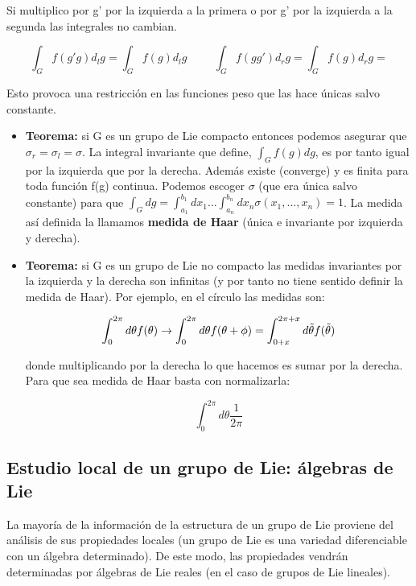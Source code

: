 \documentclass{article}
\begin{document}
Si multiplico por g' por la izquierda a la primera o por g' por la izquierda a la segunda las integrales no cambian.

$$\int _G f(g'g)d_lg=\int _G f(g)d_lg \hspace{1cm} \int _G f(gg')d_rg=\int _G f(g)d_rg=$$

Esto provoca una restricción en las funciones peso que las hace únicas salvo constante.

\bigskip
\begin{itemize}
\item      \textbf{Teorema:} si G es un grupo de Lie compacto entonces podemos asegurar que $\sigma _r=\sigma_l=\sigma$. La integral invariante que define, $\int _G f(g)d g$, es por tanto igual por la izquierda que por la derecha. Además existe (converge) y es finita para toda función f(g) continua. Podemos escoger $\sigma$ (que era única salvo constante) para que $\int _G dg=\int ^{b_1}_{a_1} dx_1...\int ^{b_n}_{a_n} dx_n \sigma (x_1,...,x_n)=1$. La medida así definida la llamamos \textbf{medida de Haar} (única e invariante por izquierda y derecha).

\item \textbf{Teorema:} si G es un grupo de Lie no compacto las medidas invariantes por la izquierda y la derecha son infinitas (y por tanto no tiene sentido definir la medida de Haar). Por ejemplo, en el círculo las medidas son:

$$\int ^{2\pi}_0 d\theta f(\theta) \to \int ^{2\pi}_0 d\theta f(\theta +\phi)= \int ^{2\pi + x}_{0+x} d\Tilde{\theta} f(\Tilde{\theta})$$

donde multiplicando por la derecha lo que hacemos es sumar por la derecha. Para que sea medida de Haar basta con normalizarla:

$$\int ^{2\pi}_0 d \theta \frac{1}{2\pi}$$

\end{itemize}

\subsection{Estudio local de un grupo de Lie: álgebras de Lie}

La mayoría de la información de la estructura de un grupo de Lie proviene del análisis de sus propiedades locales (un grupo de Lie es una variedad diferenciable con un álgebra determinado). De este modo, las propiedades vendrán determinadas por álgebras de Lie reales (en el caso de grupos de Lie lineales).
\end{document}
